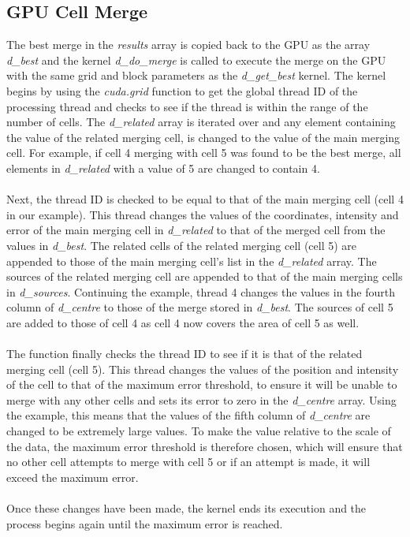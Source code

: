 \subsection{GPU Cell Merge}
The best merge in the \textit{results} array is copied back to the GPU as the array \textit{d\_best} and the kernel \textit{d\_do\_merge} is called to execute the merge on the GPU with the same grid and block parameters as the \textit{d\_get\_best} kernel. The kernel begins by using the \textit{cuda.grid} function to get the global thread ID of the processing thread and checks to see if the thread is within the range of the number of cells. The \textit{d\_related} array is iterated over and any element containing the value of the related merging cell, is changed to the value of the main merging cell. For example, if cell 4 merging with cell 5 was found to be the best merge, all elements in \textit{d\_related} with a value of 5 are changed to contain 4.
\\
\\
Next, the thread ID is checked to be equal to that of the main merging cell (cell 4 in our example). This thread changes the values of the coordinates, intensity and error of the main merging cell in \textit{d\_related} to that of the merged cell from the values in \textit{d\_best}. The related cells of the related merging cell (cell 5) are appended to those of the main merging cell's list in the \textit{d\_related} array. The sources of the related merging cell are appended to that of the main merging cells in \textit{d\_sources}. Continuing the example, thread 4 changes the values in the fourth column of \textit{d\_centre} to those of the merge stored in \textit{d\_best}. The sources of cell 5 are added to those of cell 4 as cell 4 now covers the area of cell 5 as well.
\\
\\
The function finally checks the thread ID to see if it is that of the related merging cell (cell 5). This thread changes the values of the position and intensity of the cell to that of the maximum error threshold, to ensure it will be unable to merge with any other cells and sets its error to zero in the \textit{d\_centre} array. Using the example, this means that the values of the fifth column of \textit{d\_centre} are changed to be extremely large values. To make the value relative to the scale of the data, the maximum error threshold is therefore chosen, which will ensure that no other cell attempts to merge with cell 5 or if an attempt is made, it will exceed the maximum error.
\\
\\
Once these changes have been made, the kernel ends its execution and the process begins again until the maximum error is reached.